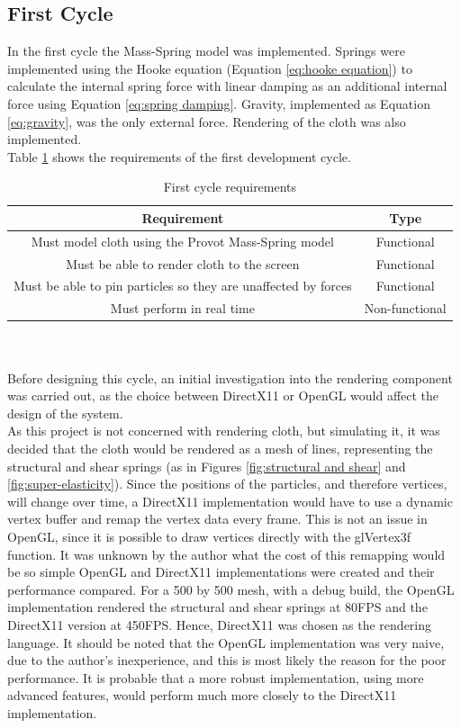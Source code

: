 \subsection{First Cycle}
In the first cycle the Mass-Spring model was implemented. Springs were implemented using the Hooke equation (Equation \ref{eq:hooke equation}) to calculate the internal spring force with linear damping as an additional internal force using Equation \ref{eq:spring damping}. Gravity, implemented as Equation \ref{eq:gravity}, was the only external force. Rendering of the cloth was also implemented.
\\Table \ref{tab:cycle 1 require} shows the requirements of the first development cycle.
\begin{table}[tp]
   \begin{minipage}{\textwidth}
      \begin{center}
         \begin{tabular}{c|c}
           Requirement & Type\\
           \hline
           Must model cloth using the Provot Mass-Spring model & Functional\\
           Must be able to render cloth to the screen & Functional\\
           Must be able to pin particles so they are unaffected by forces & Functional\\
           Must perform in real time& Non-functional\\
         \end{tabular}
      \end{center}
   \end{minipage}
   \caption{First cycle requirements}
   \label{tab:cycle 1 require}
\end{table}
\\\\Before designing this cycle, an initial investigation into the rendering component was carried out, as the choice between DirectX11 or OpenGL would affect the design of the system.
\\As this project is not concerned with rendering cloth, but simulating it, it was decided that the cloth would be rendered as a mesh of lines, representing the structural and shear springs (as in Figures \ref{fig:structural and shear} and \ref{fig:super-elasticity}). Since the positions of the particles, and therefore vertices, will change over time, a DirectX11 implementation would have to use a dynamic vertex buffer and remap the vertex data every frame. This is not an issue in OpenGL, since it is possible to draw vertices directly with the glVertex3f function. It was unknown by the author what the cost of this remapping would be so simple OpenGL and DirectX11 implementations were created and their performance compared. For a 500 by 500 mesh, with a debug build, the OpenGL implementation rendered the structural and shear springs at 80FPS and the DirectX11 version at 450FPS. Hence, DirectX11 was chosen as the rendering language. It should be noted that the OpenGL implementation was very naive, due to the author's inexperience, and this is most likely the reason for the poor performance. It is probable that a more robust implementation, using more advanced features, would perform much more closely to the DirectX11 implementation.
